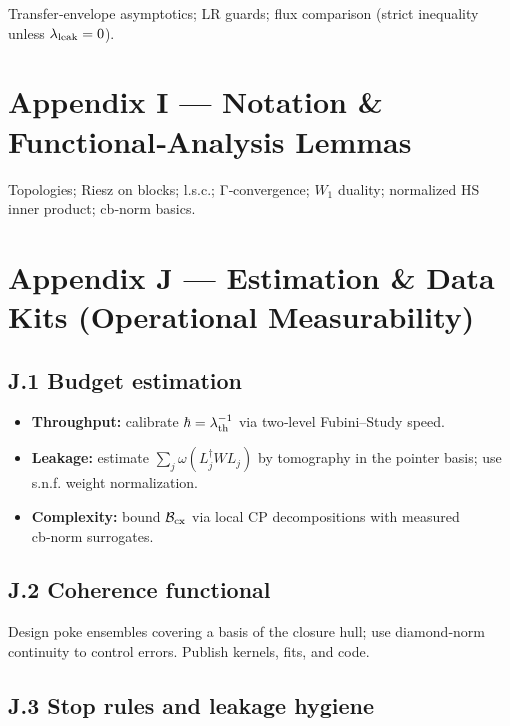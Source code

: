 \documentclass[
]{article}
\providecommand{\tightlist}{%
  \setlength{\itemsep}{0pt}\setlength{\parskip}{0pt}}
\numberwithin{equation}{section}
\begin{document}
Transfer‑envelope asymptotics; LR guards; flux comparison (strict
inequality unless \(\lambda_{\rm leak}=0\)).

\hypertarget{appendix-i-notation-functionalanalysis-lemmas}{%
\section{Appendix I --- Notation \& Functional‑Analysis
Lemmas}\label{appendix-i-notation-functionalanalysis-lemmas}}

Topologies; Riesz on blocks; l.s.c.; Γ‑convergence; \(W_1\) duality;
normalized HS inner product; cb‑norm basics.

\hypertarget{appendix-j-estimation-data-kits-operational-measurability}{%
\section{Appendix J --- Estimation \& Data Kits (Operational
Measurability)}\label{appendix-j-estimation-data-kits-operational-measurability}}

\hypertarget{j.1-budget-estimation}{%
\subsection{J.1 Budget estimation}\label{j.1-budget-estimation}}

\begin{itemize}
\tightlist
\item
  \textbf{Throughput:} calibrate \(\hbar=\lambda_{\rm th}^{-1}\) via
  two‑level Fubini--Study speed.
\item
  \textbf{Leakage:} estimate \(\sum_j\omega(L_j^\dagger W L_j)\) by
  tomography in the pointer basis; use s.n.f. weight normalization.
\item
  \textbf{Complexity:} bound \(\mathcal B_{\rm cx}\) via local CP
  decompositions with measured cb‑norm surrogates.
\end{itemize}

\hypertarget{j.2-coherence-functional}{%
\subsection{J.2 Coherence functional}\label{j.2-coherence-functional}}

Design poke ensembles covering a basis of the closure hull; use
diamond‑norm continuity to control errors. Publish kernels, fits, and
code.

\hypertarget{j.3-stop-rules-and-leakage-hygiene}{%
\subsection{J.3 Stop rules and leakage
hygiene}\label{j.3-stop-rules-and-leakage-hygiene}}
\end{document}
